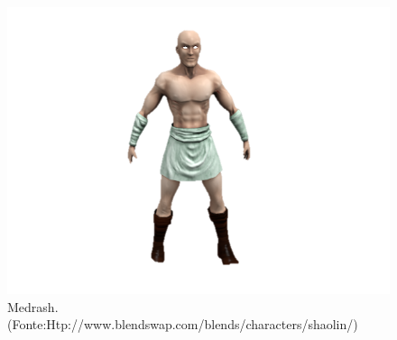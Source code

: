 \begin{figure}[H]
 \centering
 \includegraphics[scale=1]{Imagens/medrash01.png}
 \caption{Medrash.(Fonte:Htp://www.blendswap.com/blends/characters/shaolin/)}
\label{img:medrash}
\end{figure}

